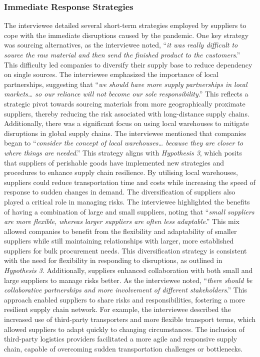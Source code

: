 \subsubsection{Immediate Response Strategies}

The interviewee detailed several short-term strategies employed by suppliers to cope with the immediate disruptions caused by the pandemic. One key strategy was sourcing alternatives, as the interviewee noted, “\textit{it was really difficult to source the raw material and then send the finished product to the customers}.” This difficulty led companies to diversify their supply base to reduce dependency on single sources. The interviewee emphasized the importance of local partnerships, suggesting that “\textit{we should have more supply partnerships in local markets… so our reliance will not become our sole responsibility}.” This reflects a strategic pivot towards sourcing materials from more geographically proximate suppliers, thereby reducing the risk associated with long-distance supply chains.
Additionally, there was a significant focus on using local warehouses to mitigate disruptions in global supply chains. The interviewee mentioned that companies began to “\textit{consider the concept of local warehouses… because they are closer to where things are needed}.” This strategy aligns with \textit{Hypothesis 3}, which posits that suppliers of perishable goods have implemented new strategies and procedures to enhance supply chain resilience. By utilising local warehouses, suppliers could reduce transportation time and costs while increasing the speed of response to sudden changes in demand. The diversification of suppliers also played a critical role in managing risks. The interviewee highlighted the benefits of having a combination of large and small suppliers, noting that “\textit{small suppliers are more flexible, whereas larger suppliers are often less adaptable}.” This mix allowed companies to benefit from the flexibility and adaptability of smaller suppliers while still maintaining relationships with larger, more established suppliers for bulk procurement needs. This diversification strategy is consistent with the need for flexibility in responding to disruptions, as outlined in \textit{Hypothesis 3}. Additionally, suppliers enhanced collaboration with both small and large suppliers to manage risks better. As the interviewee noted, “\textit{there should be collaborative partnerships and more involvement of different stakeholders}.” This approach enabled suppliers to share risks and responsibilities, fostering a more resilient supply chain network. For example, the interviewee described the increased use of third-party transporters and more flexible transport terms, which allowed suppliers to adapt quickly to changing circumstances. The inclusion of third-party logistics providers facilitated a more agile and responsive supply chain, capable of overcoming sudden transportation challenges or bottlenecks.

